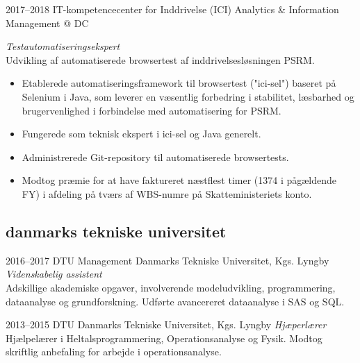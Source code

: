 \documentclass[]{../friggeri-cv} %
\begin{document}
\begin{entrylist}
\entry
{2017--2018}
{IT-kompetencecenter for Inddrivelse (ICI)}
{Analytics \& Information Management @ DC}
{\emph{Testautomatiseringsekspert}\\
Udvikling af automatiserede browsertest af inddrivelsesløsningen PSRM. 
\begin{itemize}
\item Etablerede automatiseringsframework til browsertest ("ici-sel") baseret på Selenium i Java, som leverer en væsentlig forbedring i stabilitet, læsbarhed og brugervenlighed i forbindelse med automatisering for PSRM. 
\item Fungerede som teknisk ekspert i ici-sel og Java generelt. 
\item Administrerede Git-repository til automatiserede browsertests. 
\item Modtog præmie for at have faktureret næstflest timer (1374 i pågældende FY) i afdeling på tværs af WBS-numre på Skatteministeriets konto.
\end{itemize}
}

\end{entrylist}

\subsection{danmarks tekniske universitet}

\begin{entrylist}

\entry
{2016--2017}
{DTU Management}
{Danmarks Tekniske Universitet, Kgs. Lyngby}
{\emph{Videnskabelig assistent}\\
Adskillige akademiske opgaver, involverende modeludvikling, programmering, dataanalyse og grundforskning. Udførte avancereret dataanalyse i SAS og SQL.}

\entry
{2013--2015}
{DTU}
{Danmarks Tekniske Universitet, Kgs. Lyngby}
{\emph{Hjæperlærer}\\
Hjælpelærer i Heltalsprogrammering, Operationsanalyse og Fysik. Modtog skriftlig anbefaling for arbejde i operationsanalyse.}

\end{entrylist}


\end{document}
